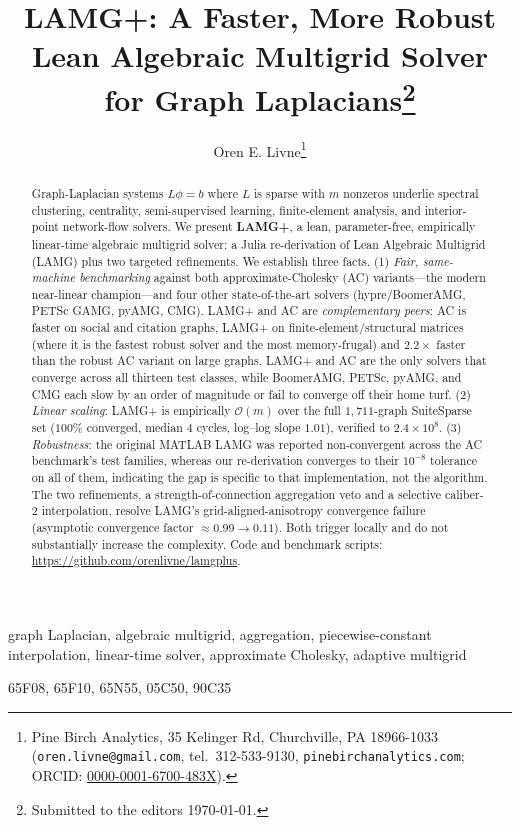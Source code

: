 \documentclass[review]{siamart220329}
\title{LAMG+: A Faster, More Robust Lean Algebraic Multigrid Solver for Graph Laplacians\thanks{Submitted to the editors \today.}}
\author{Oren E. Livne\thanks{Pine Birch Analytics, 35 Kelinger Rd, Churchville, PA 18966-1033 (\texttt{oren.livne@gmail.com}, tel.\ 312-533-9130, \texttt{pinebirchanalytics.com}; ORCID: \href{https://orcid.org/0000-0001-6700-483X}{0000-0001-6700-483X}).}}
\newcommand{\Om}{\mathcal{O}(m)}
\begin{document}
\maketitle

\begin{abstract}
Graph-Laplacian systems $L\phi=b$ where $L$ is sparse with $m$ nonzeros underlie spectral clustering, centrality, semi-supervised
learning, finite-element analysis, and interior-point network-flow solvers. We present \textbf{LAMG+},
a lean, parameter-free, empirically linear-time algebraic multigrid solver: a Julia re-derivation of
Lean Algebraic Multigrid (LAMG) plus two targeted refinements. We establish three facts. (1)
\emph{Fair, same-machine benchmarking} against both approximate-Cholesky (AC) variants---the modern
near-linear champion---and four other state-of-the-art solvers (hypre/BoomerAMG, PETSc GAMG, pyAMG,
CMG). LAMG+ and AC are \emph{complementary peers}: AC is faster on social and
citation graphs, LAMG+ on finite-element/structural matrices (where it is the fastest robust solver
and the most memory-frugal) and $2.2\times$ faster than the robust AC variant on large
graphs. LAMG+ and AC are the only solvers that converge across all thirteen test classes, while BoomerAMG, PETSc, pyAMG, and CMG each slow by an order of magnitude or fail to converge off their home turf. (2)
\emph{Linear scaling}: LAMG+ is empirically $\Om$ over the full $1{,}711$-graph SuiteSparse set
($100\%$ converged, median $4$ cycles, log--log slope $1.01$), verified to $2.4\!\times\!10^8$. (3)
\emph{Robustness}: the original MATLAB LAMG was reported non-convergent across the
AC benchmark's test families, whereas our re-derivation converges to their
$10^{-8}$ tolerance on all of them, indicating the gap is specific to that
implementation, not the algorithm. The two refinements, a strength-of-connection aggregation veto and a selective caliber-2 interpolation, resolve LAMG's grid-aligned-anisotropy convergence failure (asymptotic convergence factor $\approx0.99\!\to\!0.11$). Both trigger locally and do not substantially increase the complexity. Code and benchmark scripts: \url{https://github.com/orenlivne/lamgplus}.
\end{abstract}

\begin{keywords}
graph Laplacian, algebraic multigrid, aggregation, piecewise-constant interpolation,
linear-time solver, approximate Cholesky, adaptive multigrid
\end{keywords}

\begin{AMS}
65F08, 65F10, 65N55, 05C50, 90C35
\end{AMS}
\end{document}
